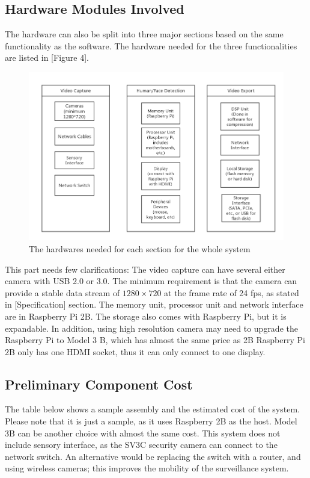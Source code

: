 \documentclass{article}
\begin{document}
\subsection{Hardware Modules Involved}
\indent The hardware can also be split into three major sections based on the same functionality as the software. The hardware needed for the three functionalities are listed in [Figure 4].

\begin{figure}[h!]
\includegraphics[width=12cm]{EECS488_hardware.png}
\caption{The hardwares needed for each section for the whole system}
\end{figure}
\indent This part needs few clarifications: The video capture can have several either camera with USB 2.0 or 3.0. The minimum requirement is that the camera can provide a stable data stream of $1280\times720$ at the frame rate of 24 fps, as stated in [Specification] section.\newline
\indent The memory unit, processor unit and network interface are in Raspberry Pi 2B. The storage also comes with Raspberry Pi, but it is expandable. In addition, using high resolution camera may need to upgrade the Raspberry Pi to Model 3 B, which has almost the same price as 2B\newline
\indent Raspberry Pi 2B only has one HDMI socket, thus it can only connect to one display.

\subsection{Preliminary Component Cost}
\indent The table below shows a sample assembly and the estimated cost of the system. Please note that it is just a sample, as it uses Raspberry 2B as the host. Model 3B can be another choice with almost the same cost. This system does not include sensory interface, as the SV3C security camera can connect to the network switch. An alternative would be replacing the switch with a router, and using wireless cameras; this improves the mobility of the surveillance system.
\end{document}

